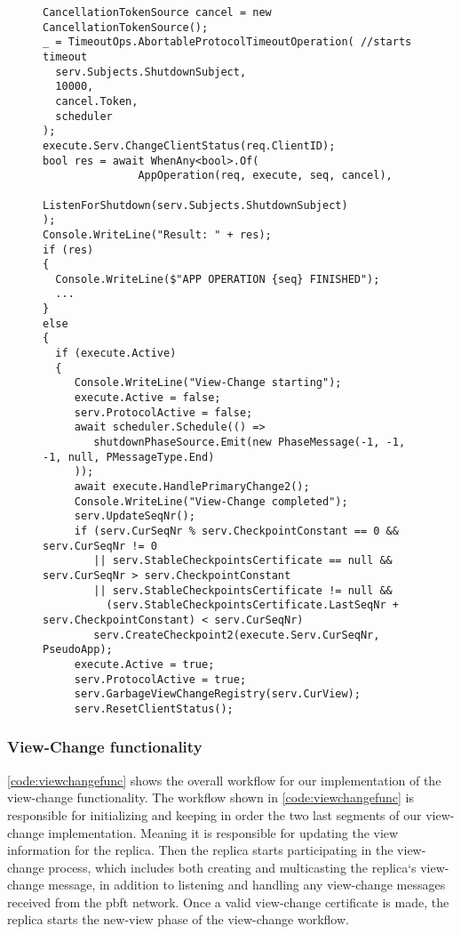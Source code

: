 \begin{figure}[H]
	\centering
	\begin{lstlisting}[label = code:timeout, caption=Handling timeout for the normal protocol workflow and initiate the View-Change process, captionpos = b, basicstyle=\scriptsize]
CancellationTokenSource cancel = new CancellationTokenSource();
_ = TimeoutOps.AbortableProtocolTimeoutOperation( //starts timeout
  serv.Subjects.ShutdownSubject,
  10000,
  cancel.Token,
  scheduler
);
execute.Serv.ChangeClientStatus(req.ClientID);
bool res = await WhenAny<bool>.Of(
               AppOperation(req, execute, seq, cancel),
               ListenForShutdown(serv.Subjects.ShutdownSubject)
);
Console.WriteLine("Result: " + res);
if (res)
{
  Console.WriteLine($"APP OPERATION {seq} FINISHED");
  ...
}
else
{
  if (execute.Active)
  {
     Console.WriteLine("View-Change starting");
     execute.Active = false;
     serv.ProtocolActive = false;
     await scheduler.Schedule(() =>
        shutdownPhaseSource.Emit(new PhaseMessage(-1, -1, -1, null, PMessageType.End)
     ));
     await execute.HandlePrimaryChange2();
     Console.WriteLine("View-Change completed");
     serv.UpdateSeqNr();
     if (serv.CurSeqNr % serv.CheckpointConstant == 0 && serv.CurSeqNr != 0
        || serv.StableCheckpointsCertificate == null && serv.CurSeqNr > serv.CheckpointConstant
        || serv.StableCheckpointsCertificate != null &&
          (serv.StableCheckpointsCertificate.LastSeqNr + serv.CheckpointConstant) < serv.CurSeqNr)
        serv.CreateCheckpoint2(execute.Serv.CurSeqNr, PseudoApp);
     execute.Active = true;
     serv.ProtocolActive = true;
     serv.GarbageViewChangeRegistry(serv.CurView);
     serv.ResetClientStatus();
   \end{lstlisting}
\end{figure}


\subsubsection{View-Change functionality}
\autoref{code:viewchangefunc} shows the overall workflow for our implementation of the view-change functionality.  The workflow shown in \autoref{code:viewchangefunc} is responsible for initializing and keeping in order the two last segments of our view-change implementation.  Meaning it is responsible for updating the view information for the replica. Then the replica starts participating in the view-change process, which includes both creating and multicasting the replica`s view-change message, in addition to listening and handling any view-change messages received from the \ac{pbft} network. Once a valid view-change certificate is made, the replica starts the new-view phase of the view-change workflow. 

